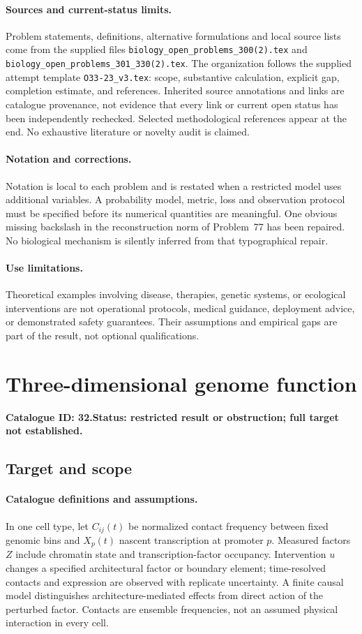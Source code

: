 \documentclass[11pt]{article}
\begin{document}
\paragraph{Sources and current-status limits.}
Problem statements, definitions, alternative formulations and local source lists
come from the supplied files
\texttt{biology\_open\_problems\_300(2).tex} and
\texttt{biology\_open\_problems\_301\_330(2).tex}.
The organization follows the supplied attempt template
\texttt{O33-23\_v3.tex}: scope, substantive calculation, explicit gap,
completion estimate, and references. Inherited source annotations and links are
catalogue provenance, not evidence that every link or current open status has
been independently rechecked. Selected methodological references appear at the
end. No exhaustive literature or novelty audit is claimed.

\paragraph{Notation and corrections.}
Notation is local to each problem and is restated when a restricted model uses
additional variables. A probability model, metric, loss and observation protocol
must be specified before its numerical quantities are meaningful. One obvious
missing backslash in the reconstruction norm of Problem~77 has been repaired.
No biological mechanism is silently inferred from that typographical repair.

\paragraph{Use limitations.}
Theoretical examples involving disease, therapies, genetic systems, or ecological
interventions are not operational protocols, medical guidance, deployment advice,
or demonstrated safety guarantees. Their assumptions and empirical gaps are part
of the result, not optional qualifications.

\setcounter{section}{31}
\section{Three-dimensional genome function}
\label{prob:032}
\noindent\textbf{Catalogue ID: 32.}\quad \textbf{Status: restricted result or obstruction; full target not established.}
\subsection{Target and scope}
\paragraph{Catalogue definitions and assumptions.}
In one cell type, let $C_{ij}(t)$ be normalized contact frequency between fixed genomic bins and $X_p(t)$ nascent transcription at promoter $p$. Measured factors $Z$ include chromatin state and transcription-factor occupancy. Intervention $u$ changes a specified architectural factor or boundary element; time-resolved contacts and expression are observed with replicate uncertainty. A finite causal model distinguishes architecture-mediated effects from direct action of the perturbed factor. Contacts are ensemble frequencies, not an assumed physical interaction in every cell.
\end{document}
